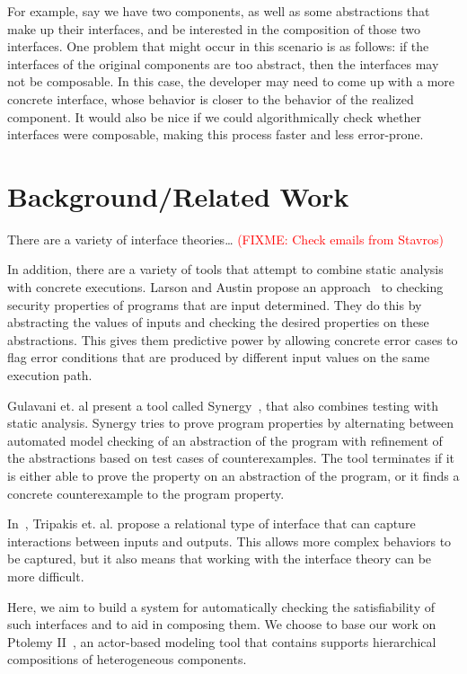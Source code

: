 \documentclass[preprint,11pt]{sigplanconf}
\newcommand{\fixme}[1]{\textcolor{red}{(FIXME: #1)}}
\begin{document}
For example, say we have two components, as well as some abstractions that
make up their interfaces, and be interested in the composition of those two
interfaces. One problem that might occur in this scenario is as follows: if the
interfaces of the original components are too abstract, then the interfaces
may not be composable. In this case, the developer may need to come up with a
more concrete interface, whose behavior is closer to the behavior of the
realized component. It would also be nice if we could algorithmically check
whether interfaces were composable, making this process faster and less
error-prone.

\section{Background/Related Work}
There are a variety of interface theories\ldots
\fixme{Check emails from Stavros} %

In addition, there are a variety of tools that attempt to combine static analysis
with concrete executions.
%
Larson and Austin propose an approach~\cite{larsonAustin:2003:coverageDetection} 
to checking security properties of programs that are input determined.  They do
this by abstracting the values of inputs and checking the desired properties on
these abstractions. This gives them predictive power by allowing concrete error
cases to flag error conditions that are produced by different input values on the
same execution path.

Gulavani et. al present a tool called Synergy~\cite{gulavani:synergy}, that
also combines testing with static analysis.  Synergy tries to prove program
properties by alternating between automated model checking of an abstraction of
the program with refinement of the abstractions based on test cases of
counterexamples.  The tool terminates if it is either able to prove the property
on an abstraction of the program, or it finds a concrete counterexample to the
program property.

In~\cite{relationalInterfaces}, Tripakis et. al. propose a relational type of
interface that can capture interactions between inputs and outputs.
This allows more complex behaviors to be captured, but it also means that
working with the interface theory can be more difficult.

Here, we aim to build a system for automatically checking the satisfiability
of such interfaces and to aid in composing them.
We choose to base our work on Ptolemy II~\cite{ptII}, an actor-based modeling
tool that contains supports hierarchical compositions of heterogeneous components.
\end{document}

